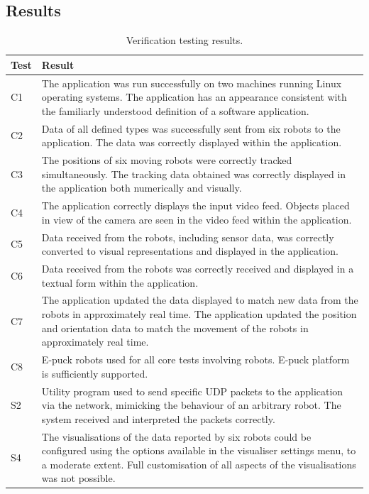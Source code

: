 \subsection{Results}
\begin{longtable}{ l p{10cm} }
\caption[Verification Testing Results]{Verification testing results.}\\
 \textbf{Test} & \textbf{Result}\\
 \hline
 C1 & The application was run successfully on two machines running Linux operating systems. The application has an appearance consistent with the familiarly understood definition of a software application.\\\hline
 C2 & Data of all defined types was successfully sent from six robots to the application. The data was correctly displayed within the application.\\\hline
 C3 & The positions of six moving robots were correctly tracked simultaneously. The tracking data obtained was correctly displayed in the application both numerically and visually.\\\hline
 C4 & The application correctly displays the input video feed. Objects placed in view of the camera are seen in the video feed within the application.\\\hline
 C5 & Data received from the robots, including sensor data, was correctly converted to visual representations and displayed in the application.\\\hline
 C6 & Data received from the robots was correctly received and displayed in a textual form within the application.\\\hline
 C7 & The application updated the data displayed to match new data from the robots in approximately real time. The application updated the position and orientation data to match the movement of the robots in approximately real time.\\\hline
 C8 & E-puck robots used for all core tests involving robots. E-puck platform is sufficiently supported.\\\hline
 \hline
 S2 & Utility program used to send specific UDP packets to the application via the network, mimicking the behaviour of an arbitrary robot. The system received and interpreted the packets correctly.\\\hline
 S4 & The visualisations of the data reported by six robots could be configured using the options available in the visualiser settings menu, to a moderate extent. Full customisation of all aspects of the visualisations was not possible.\\ \hline

\end{longtable}
